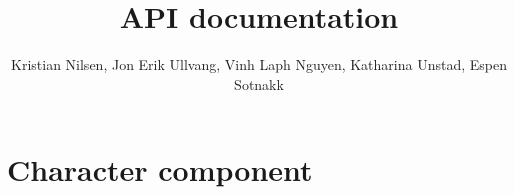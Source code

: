 \documentclass[11pt,a4paper,norsk]{article}
\title{API documentation}
\author{Kristian Nilsen, Jon Erik Ullvang, Vinh Laph Nguyen, Katharina Unstad, Espen Sotnakk}
\begin{document}
\maketitle
{}\selectfont
\section*{Character component}
\end{document}
